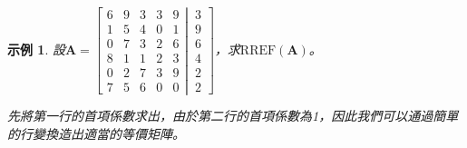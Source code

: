 \documentclass[12pt]{article}
\newcommand{\rref}{\mathrm{RREF}}
\newtheorem*{example}{示例}
\begin{document}
    \begin{example}
        設$\mathbf{A}=\left[\begin{matrix}
            6& 9& 3& 3& 9\\
            1& 5& 4& 0& 1\\
            0& 7& 3& 2& 6\\
            8& 1& 1& 2& 3\\
            0& 2& 7& 3& 9\\
            7& 5& 6& 0& 0
        \end{matrix}
        \left|
            \,
            \begin{matrix}
            3\\9\\6\\4\\2\\2
            \end{matrix}
        \right.
        \right]$，求$\rref(\mathbf{A})$。

        先將第一行的首項係數求出，由於第二行的首項係數為1，因此我們可以通過簡單的行變換造出適當的等價矩陣。


\end{example}
\end{document}
